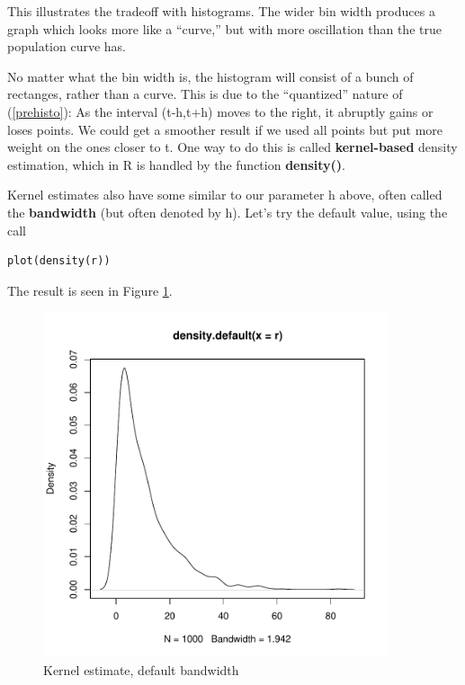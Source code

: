 This illustrates the tradeoff with histograms.  The wider bin width
produces a graph which looks more like a ``curve,'' but with more
oscillation than the true population curve has.

No matter what the bin width is, the histogram will consist of a bunch
of rectanges, rather than a curve.  This is due to the ``quantized''
nature of (\ref{prehisto}):  As the interval (t-h,t+h) moves to the
right, it abruptly gains or loses points.  We could get a smoother
result if we used all points but put more weight on the ones closer to
t.  One way to do this is called {\bf kernel-based} density estimation,
which in R is handled by the function {\bf density()}.  

Kernel estimates also have some similar to our parameter h above,
often called the {\bf bandwidth} (but often denoted by h).  Let's try
the default value, using the call

\begin{Verbatim}[fontsize=\relsize{-2}]
plot(density(r))
\end{Verbatim}

The result is seen in Figure \ref{h3}. 

\begin{figure}[tb] 
\centerline{
\includegraphics[width=4.0in]{Hist3.pdf} 
}
\caption{Kernel estimate, default bandwidth}
\label{h3}  
\end{figure}

